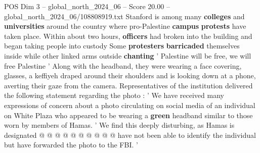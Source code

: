 \begin{textsample}{POS Dim 3 – global\_north\_2024\_06 – Score 20.00 – global\_north\_2024\_06/108808919.txt}
Stanford is among many \textbf{colleges} and \textbf{universities} around the country where pro-Palestine \textbf{campus} \textbf{protests} have taken place.
Within about two hours, \textbf{officers} had broken into the building and began taking people into custody Some \textbf{protesters} \textbf{barricaded} themselves inside while other linked arms outside \textbf{chanting} ' Palestine will be free, we will free Palestine ' Along with the headband, they were wearing a face covering, glasses, a keffiyeh draped around their shoulders and is looking down at a phone, averting their gaze from the camera.
Representatives of the institution delivered the following statement regarding the photo : ' We have received many expressions of concern about a photo circulating on social media of an individual on White Plaza who appeared to be wearing a \textbf{green} headband similar to those worn by members of Hamas. ' We find this deeply disturbing, as Hamas is designated @ @ @ @ @ @ @ @ @ @ have not been able to identify the individual but have forwarded the photo to the FBI. '

\end{textsample}
